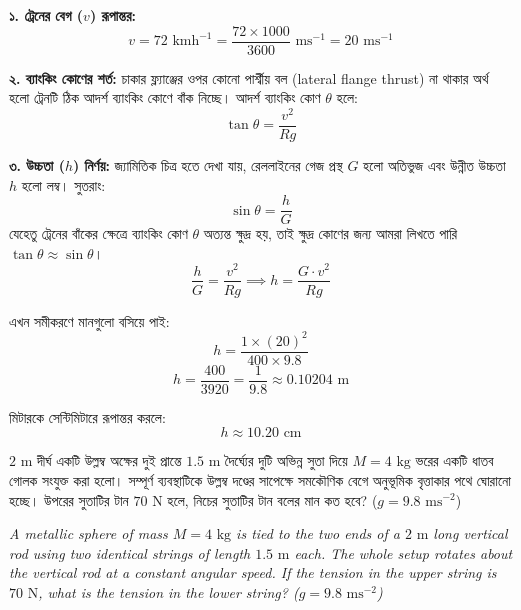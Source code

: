 \documentclass[12pt, a4paper]{article}
\begin{document}
\begin{tcolorbox}[solutionbox={সমাধান (Solution)}]
\noindent
\textbf{১. ট্রেনের বেগ ($v$) রূপান্তর:}
$$v = 72\text{ kmh}^{-1} = \frac{72 \times 1000}{3600}\text{ ms}^{-1} = 20\text{ ms}^{-1}$$

\vspace{0.5em}
\textbf{২. ব্যাংকিং কোণের শর্ত:}
চাকার ফ্ল্যাঞ্জের ওপর কোনো পার্শ্বীয় বল (lateral flange thrust) না থাকার অর্থ হলো ট্রেনটি ঠিক আদর্শ ব্যাংকিং কোণে বাঁক নিচ্ছে। আদর্শ ব্যাংকিং কোণ $\theta$ হলে:
$$\tan\theta = \frac{v^2}{Rg}$$

\vspace{0.5em}
\textbf{৩. উচ্চতা ($h$) নির্ণয়:}
জ্যামিতিক চিত্র হতে দেখা যায়, রেললাইনের গেজ প্রস্থ $G$ হলো অতিভুজ এবং উন্নীত উচ্চতা $h$ হলো লম্ব। সুতরাং:
$$\sin\theta = \frac{h}{G}$$
যেহেতু ট্রেনের বাঁকের ক্ষেত্রে ব্যাংকিং কোণ $\theta$ অত্যন্ত ক্ষুদ্র হয়, তাই ক্ষুদ্র কোণের জন্য আমরা লিখতে পারি $\tan\theta \approx \sin\theta$।
$$\frac{h}{G} = \frac{v^2}{Rg} \implies h = \frac{G \cdot v^2}{Rg}$$

এখন সমীকরণে মানগুলো বসিয়ে পাই:
$$h = \frac{1 \times (20)^2}{400 \times 9.8}$$
$$h = \frac{400}{3920} = \frac{1}{9.8} \approx 0.10204\text{ m}$$

মিটারকে সেন্টিমিটারে রূপান্তর করলে:
$$h \approx 10.20\text{ cm}$$
\end{tcolorbox}
\vspace{1em}
\begin{tcolorbox}[questionbox={প্রশ্ন (Question) 24}]
\noindent
$2\text{ m}$ দীর্ঘ একটি উল্লম্ব অক্ষের দুই প্রান্তে $1.5\text{ m}$ দৈর্ঘ্যের দুটি অভিন্ন সুতা দিয়ে $M = 4\text{ kg}$ ভরের একটি ধাতব গোলক সংযুক্ত করা হলো। সম্পূর্ণ ব্যবস্থাটিকে উল্লম্ব দণ্ডের সাপেক্ষে সমকৌণিক বেগে অনুভূমিক বৃত্তাকার পথে ঘোরানো হচ্ছে। উপরের সুতাটির টান $70\text{ N}$ হলে, নিচের সুতাটির টান বলের মান কত হবে? ($g = 9.8\text{ ms}^{-2}$)

\vspace{0.8em}
\begin{english}
\noindent\textit{\color{darkgray}
A metallic sphere of mass $M = 4\text{ kg}$ is tied to the two ends of a $2\text{ m}$ long vertical rod using two identical strings of length $1.5\text{ m}$ each. The whole setup rotates about the vertical rod at a constant angular speed. If the tension in the upper string is $70\text{ N}$, what is the tension in the lower string? ($g = 9.8\text{ ms}^{-2}$)
}
\end{english}
\end{tcolorbox}
\end{document}
